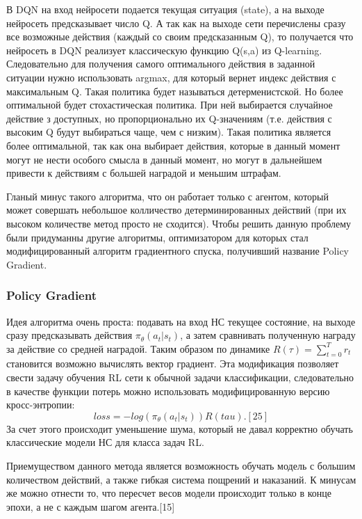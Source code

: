 \documentclass[bachelor, och, coursework]{shiza}
\begin{document}
В DQN на вход нейросети подается текущая ситуация (state), а на выходе нейросеть предсказывает число Q. А так как на выходе сети перечислены сразу все возможные действия
(каждый со своим предсказанным Q), то получается что нейросеть в DQN реализует классическую функцию Q(s,a) из Q-learning. Следовательно для получения самого оптимального
действия в заданной ситуации нужно использовать argmax, для который вернет индекс действия с максимальным Q. Такая политика будет называться детерменистской. Но более
оптимальной будет стохастическая политика. При ней выбирается случайное действие з доступных, но пропорционально их Q-значениям (т.е. действия с высоким Q будут выбираться
чаще, чем с низким). Такая политика является более оптимальной, так как она выбирает действия, которые в данный момент могут не нести особого смысла в данный момент, но могут
в дальнейшем привести к действиям с большей наградой и меньшим штрафам.

Гланый минус такого алгоритма, что он работает только с агентом, который может совершать небольшое колличество детерминированных действий (при их высоком количестве метод просто не сходится).
Чтобы решить данную проблему были придуманны другие алгоритмы, оптимизатором для которых стал модифицированный алгоритм градиентного спуска, получивший название Policy Gradient.

\subsubsection{Policy Gradient}
Идея алгоритма очень проста: подавать на вход НС текущее состояние, на выходе сразу предсказывать действия $\pi_\theta(a_t|s_t)$, а затем сравнивать полученную награду за действие
со средней наградой. Таким образом по динамике $R(\tau) = \sum_{t=0}^T r_t$ становится возможно вычислять вектор градиент. Эта модификация позволяет свести задачу обучения RL сети к
обычной задачи классификации, следовательно в качестве функции потерь можно использовать модифицированную версию кросс-энтропии:
\begin{equation}
    loss = -log(\pi_\theta(a_t|s_t))R(tau). [25]
\end{equation}
За счет этого происходит уменьшение шума, который не давал корректно обучать классические модели НС для класса задач RL.

Приемуществом данного метода является возможность обучать модель с большим количеством действий, а также гибкая система пощрений и наказаний. К минусам же можно отнести
то, что пересчет весов модели происходит только в конце эпохи, а не с каждым шагом агента.[15]
\end{document}
